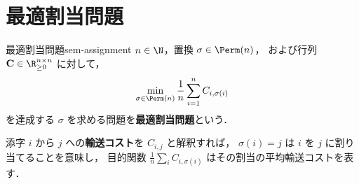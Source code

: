 \section{最適割当問題}
\label{sec:sem-assignment}

\begin{definition}{最適割当問題}{sem-assignment}
  $n \in \N$，置換 $\sigma \in \Perm(n)$，
  および行列 $\mathbf{C} \in \R_{\geq 0}^{n \times n}$ に対して，
  \[
    \min_{\sigma \in \Perm(n)} \frac{1}{n} \sum_{i=1}^{n} C_{i, \sigma(i)}
  \]
  を達成する $\sigma$ を求める問題を\textbf{最適割当問題}という．
\end{definition}

添字 $i$ から $j$ への\textbf{輸送コスト}を $C_{i,j}$ と解釈すれば，
$\sigma(i) = j$ は $i$ を $j$ に割り当てることを意味し，
目的関数 $\frac{1}{n}\sum_i C_{i, \sigma(i)}$ はその割当の平均輸送コストを表す．

